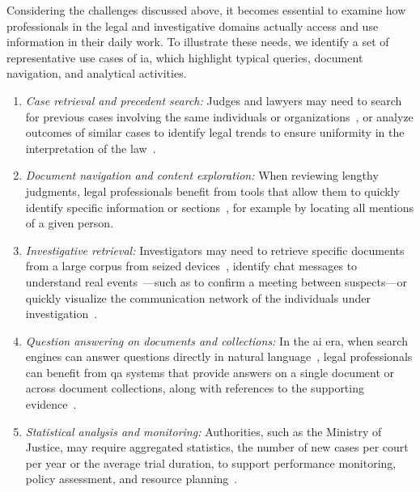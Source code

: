 Considering the challenges discussed above, it becomes essential to examine how professionals in the legal and investigative domains actually access and use information in their daily work.
To illustrate these needs, we identify a set of representative use cases of \acf{ia}, which highlight typical queries, document navigation, and analytical activities.
\begin{enumerate}[leftmargin=*,label=\textit{UC~\arabic*:},ref=\textit{UC~\arabic*}]
    \item \label{uc:case-retrieval} \emph{Case retrieval and precedent search:} Judges and lawyers may need to search for previous cases involving the same individuals or organizations~\cite{human-ai-system-legal-precedent-search-china}, or analyze outcomes of similar cases to identify legal trends to ensure uniformity in the interpretation of the law~\cite{egea2024does}.
    \item \label{uc:navigation} \emph{Document navigation and content exploration:} When reviewing lengthy judgments, legal professionals benefit from tools that allow them to quickly identify specific information or sections~\cite{swoopes2025interfacedesignsupportlegal,ziwei_abstractexplorer_2025,raymond_skimming_sci_2023}, for example by locating all mentions of a given person.
    \item \label{uc:investigative-retrieval} \emph{Investigative retrieval:} Investigators may need to retrieve specific documents from a large corpus from seized devices~\cite{BEEBE200749}, identify chat messages to understand real events~\cite{pirzada2024framework}---such as to confirm a meeting between suspects---or quickly visualize the communication network of the individuals under investigation~\cite{Sonakshi_whatsapp_group_2025}.
    \item \label{uc:qa} \emph{Question answering on documents and collections:} In the \acf{ai} era, when search engines can answer questions directly in natural language~\cite{Google2024generative_search}, legal professionals can benefit from \acf{qa} systems that provide answers on a single document or across document collections, along with references to the supporting evidence~\cite{HAN2024121052legalasst,}.
    \item \label{uc:stats} \emph{Statistical analysis and monitoring:} Authorities, such as the Ministry of Justice, may require aggregated statistics, \eg the number of new cases per court per year or the average trial duration, to support performance monitoring, policy assessment, and resource planning~\cite{bellandi2025streamlining}.
\end{enumerate}

